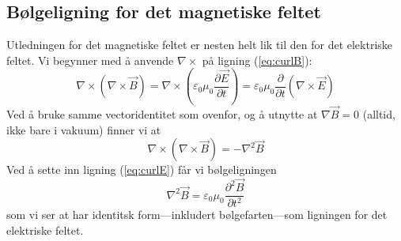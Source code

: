 \documentclass[a4paper,norsk,12pt]{article}
\begin{document}
\subsection*{Bølgeligning for det magnetiske feltet}
Utledningen for det magnetiske feltet er nesten helt lik til den for det elektriske feltet. Vi begynner med å anvende $\nabla\times$ på ligning (\ref{eq:curlB}):
\begin{displaymath}
	\nabla\times\left(\nabla\times\vec{B}\right) = \nabla\times\left(\varepsilon_0\mu_0\frac{\partial \vec{E}}{\partial t}\right) 
	= \varepsilon_0\mu_0\frac{\partial}{\partial t}\left(\nabla\times \vec{E}\right)
\end{displaymath}
Ved å bruke samme vectoridentitet som ovenfor, og å utnytte at $\nabla\vec{B}=0$ (alltid, ikke bare i vakuum) finner vi at
\begin{displaymath}
	\nabla\times\left(\nabla\times\vec{B}\right) = -\nabla^2\vec{B}
\end{displaymath}
Ved å sette inn ligning (\ref{eq:curlE}) får vi bølgeligningen
\begin{displaymath} 
	\nabla^2\vec{B} = \varepsilon_0\mu_0\frac{\partial^2\vec{B}}{\partial t^2}
\end{displaymath}
som vi ser at har identitsk form---inkludert bølgefarten---som ligningen for det elektriske feltet.
\end{document}
